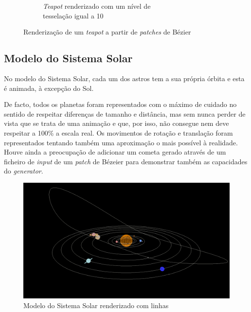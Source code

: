 \documentclass[a4paper, 11pt]{article}
\begin{document}
\begin{figure}[H]
\begin{subfigure}{.5\textwidth}
    \caption{\textit{Teapot} renderizado com um nível de \\ tesselação igual a 10}
\end{subfigure}
\caption{Renderização de um \textit{teapot} a partir de \textit{patches} de Bézier}
\end{figure}

\subsection{Modelo do Sistema Solar}

No modelo do Sistema Solar, cada um dos astros tem a sua própria órbita e esta é animada, à 
excepção do Sol.

De facto, todos os planetas foram representados com o máximo de cuidado no sentido de respeitar 
diferenças de tamanho e distância, mas sem nunca perder de vista que se trata de uma animação e 
que, por isso, não consegue nem deve respeitar a 100\% a escala real. Os movimentos de rotação e 
translação foram representados tentando também uma aproximação o mais possível à realidade. 
Houve ainda a preocupação de adicionar um cometa gerado através de um ficheiro de \textit{input} 
de um \textit{patch} de Bézeier para demonstrar também as capacidades do \textit{generator}.

\begin{figure}[H]
    \centering
    \includegraphics[width=\textwidth]{img/lines.png}
    \caption{Modelo do Sistema Solar renderizado com linhas}
\end{figure}

\vspace{1cm}
\end{document}

